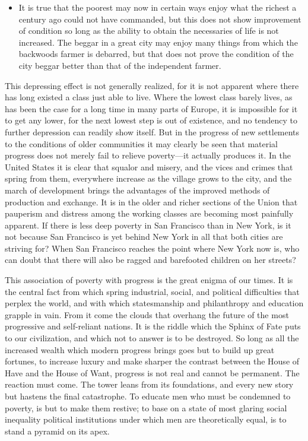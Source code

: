 \begin{itemize}
\tightlist
\item
  It is true that the poorest may now in certain ways enjoy what the
  richest a century ago could not have commanded, but this does not show
  improvement of condition so long as the ability to obtain the
  necessaries of life is not increased. The beggar in a great city may
  enjoy many things from which the backwoods farmer is debarred, but
  that does not prove the condition of the city beggar better than that
  of the independent farmer.
\end{itemize}

This depressing effect is not generally realized, for it is not apparent
where there has long existed a class just able to live. Where the lowest
class barely lives, as has been the case for a long time in many parts
of Europe, it is impossible for it to get any lower, for the next lowest
step is out of existence, and no tendency to further depression can
readily show itself. But in the progress of new settlements to the
conditions of older communities it may clearly be seen that material
progress does not merely fail to relieve poverty---it actually produces
it. In the United States it is clear that squalor and misery, and the
vices and crimes that spring from them, everywhere increase as the
village grows to the city, and the march of development brings the
advantages of the improved methods of production and exchange. It is in
the older and richer sections of the Union that pauperism and distress
among the working classes are becoming most painfully apparent. If there
is less deep poverty in San Francisco than in New York, is it not
because San Francisco is yet behind New York in all that both cities are
striving for? When San Francisco reaches the point where New York now
is, who can doubt that there will also be ragged and barefooted children
on her streets?

This association of poverty with progress is the great enigma of our
times. It is the central fact from which spring industrial, social, and
political difficulties that perplex the world, and with which
statesmanship and philanthropy and education grapple in vain. From it
come the clouds that overhang the future of the most progressive and
self-reliant nations. It is the riddle which the Sphinx of Fate puts to
our civilization, and which not to answer is to be destroyed. So long as
all the increased wealth which modern progress brings goes but to build
up great fortunes, to increase luxury and make sharper the contrast
between the House of Have and the House of Want, progress is not real
and cannot be permanent. The reaction must come. The tower leans from
its foundations, and every new story but hastens the final catastrophe.
To educate men who must be condemned to poverty, is but to make them
restive; to base on a state of most glaring social inequality political
institutions under which men are theoretically equal, is to stand a
pyramid on its apex.

